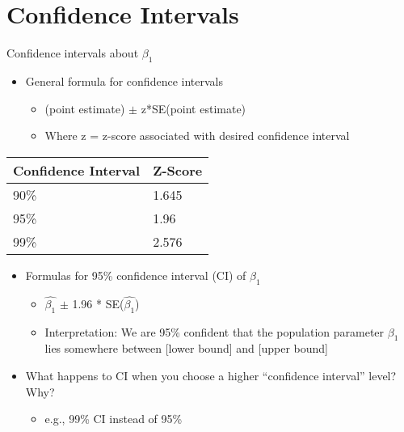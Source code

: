 \documentclass[
  8pt,
  ignorenonframetext,
  dvipsnames]{beamer}
\providecommand{\tightlist}{%
  \setlength{\itemsep}{0pt}\setlength{\parskip}{0pt}}
\let\olditem\item
\renewcommand{\item}{%
  \olditem\vspace{4pt}
}
\begin{document}
\hypertarget{confidence-intervals}{%
\section{Confidence Intervals}\label{confidence-intervals}}

\begin{frame}{Confidence intervals about \(\beta_1\)}
\protect\hypertarget{confidence-intervals-about-beta_1}{}

\begin{itemize}
\tightlist
\item
  General formula for confidence intervals

  \begin{itemize}
  \tightlist
  \item
    (point estimate) \(\pm\) z*SE(point estimate)
  \item
    Where z = z-score associated with desired confidence interval
  \end{itemize}
\end{itemize}

\begin{longtable}[]{@{}ll@{}}
\toprule
Confidence Interval & Z-Score\tabularnewline
\midrule
\endhead
90\% & 1.645\tabularnewline
95\% & 1.96\tabularnewline
99\% & 2.576\tabularnewline
\bottomrule
\end{longtable}

\medskip

\begin{itemize}
\tightlist
\item
  Formulas for 95\% confidence interval (CI) of \(\beta_1\)

  \begin{itemize}
  \tightlist
  \item
    \(\hat{\beta_1}\) \(\pm\) 1.96 * SE(\(\hat{\beta_1}\))
  \item
    Interpretation: We are 95\% confident that the population parameter
    \(\beta_1\) lies somewhere between {[}lower bound{]} and {[}upper
    bound{]}
  \end{itemize}
\end{itemize}

\medskip

\begin{itemize}
\tightlist
\item
  What happens to CI when you choose a higher ``confidence interval''
  level? Why?

  \begin{itemize}
  \tightlist
  \item
    e.g., 99\% CI instead of 95\%
  \end{itemize}
\end{itemize}

\end{frame}
\end{document}
